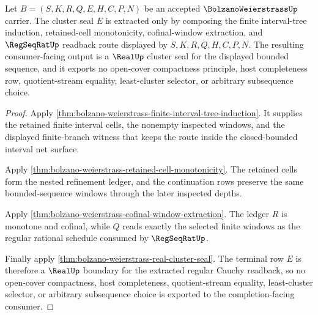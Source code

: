 \begin{theorem}
\label{thm:bolzano-weierstrass-cluster-seal-extraction}
Let $B=(S,K,R,Q,E,H,C,P,N)$ be an accepted $\BolzanoWeierstrassUp$ carrier. The cluster seal $E$ is extracted only by composing the finite interval-tree induction, retained-cell monotonicity, cofinal-window extraction, and $\RegSeqRatUp$ readback route displayed by $S,K,R,Q,H,C,P,N$. The resulting consumer-facing output is a $\RealUp$ cluster seal for the displayed bounded sequence, and it exports no open-cover compactness principle, host completeness row, quotient-stream equality, least-cluster selector, or arbitrary subsequence choice.
\end{theorem}
\begin{proof}
Apply \autoref{thm:bolzano-weierstrass-finite-interval-tree-induction}. It supplies the retained finite interval cells, the nonempty inspected windows, and the displayed finite-branch witness that keeps the route inside the closed-bounded interval net surface.

Apply \autoref{thm:bolzano-weierstrass-retained-cell-monotonicity}. The retained cells form the nested refinement ledger, and the continuation rows preserve the same bounded-sequence windows through the later inspected depths.

Apply \autoref{thm:bolzano-weierstrass-cofinal-window-extraction}. The ledger $R$ is monotone and cofinal, while $Q$ reads exactly the selected finite windows as the regular rational schedule consumed by $\RegSeqRatUp$.

Finally apply \autoref{thm:bolzano-weierstrass-real-cluster-seal}. The terminal row $E$ is therefore a $\RealUp$ boundary for the extracted regular Cauchy readback, so no open-cover compactness, host completeness, quotient-stream equality, least-cluster selector, or arbitrary subsequence choice is exported to the completion-facing consumer.
\end{proof}

